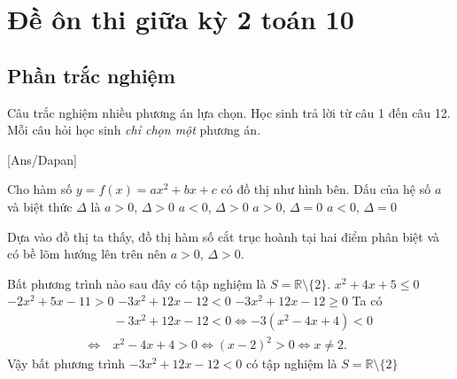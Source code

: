 \section{Đề ôn thi giữa kỳ 2 toán 10}
\subsection{Phần trắc nghiệm}
Câu trắc nghiệm nhiều phương án lựa chọn. Học sinh trả lời từ
câu 1 đến câu 12. Mỗi câu hỏi học sinh \textit{chỉ chọn một} phương án.

[Ans/Dapan]

\hienthiloigiaiex

\begin{ex}%
\immini
{
Cho hàm số $y=f(x)=ax^2+bx+c$ có đồ thị như hình bên. Dấu của hệ số $a$ và biệt thức $\Delta$ là
\choice
{\True $a>0$, $\Delta>0$}
{$a<0$, $\Delta>0$}
{$a>0$, $\Delta=0$}
{$a<0$, $\Delta=0$}
}
{
}
\loigiai
{
Dựa vào đồ thị ta thấy, đồ thị hàm số cắt trục hoành tại hai điểm phân biệt và có bề lõm hướng lên trên nên $a>0$, $\Delta>0$.
}
\end{ex}

\begin{ex}%
Bất phương trình nào sau đây có tập nghiệm là $S=\mathbb{R}\setminus\{2\}$.
\choice
{$x^2+4x+5\leq0$}
{$-2x^2+5x-11>0$}
{\True $-3x^2+12x-12<0$}
{$-3x^2+12x-12\geq0$}
\loigiai
{
Ta có
$$\begin{aligned}
& \ -3x^2+12x-12<0 \Leftrightarrow -3\left(x^2-4x+4\right)<0 \\
\Leftrightarrow & \ x^2-4x+4>0\Leftrightarrow \left(x-2\right)^2>0 \Leftrightarrow x\neq2.
\end{aligned}$$
Vậy bất phương trình $-3x^2+12x-12<0$ có tập nghiệm là $S=\mathbb{R}\setminus\{2\}$
}
\end{ex}


